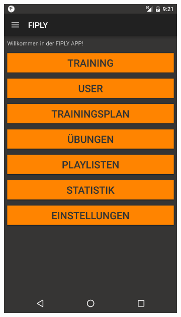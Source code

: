 \documentclass[FIPLY_base.tex]{subfiles}
\begin{document}
\begin{figure}[h]
	\begin{subfigure}[b]{0.3\textwidth}
	\includegraphics[scale=0.15]{img/NavDrawerClosed}
	\end{subfigure}
	\hfil
	\begin{subfigure}[b]{0.3\textwidth}

\end{subfigure}
\end{figure}
\end{document}
